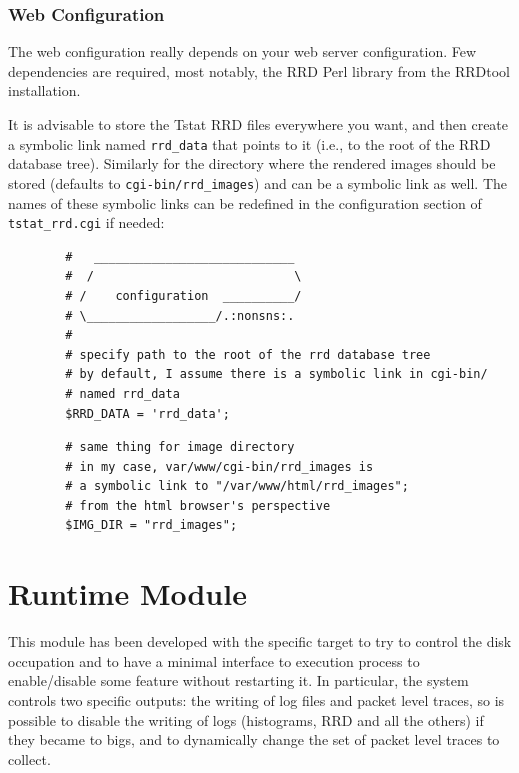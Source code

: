 \documentclass[11pt]{article}
\begin{document}
\subsubsection{Web Configuration\label{Web_Configuration}}


The web configuration really depends on your web server configuration. Few
dependencies are required, most notably, the RRD Perl library from the RRDtool
installation.



It is advisable to store the Tstat RRD files
everywhere you want, and then create a symbolic link 
named \texttt{rrd\_data} that points to it (i.e., to the root of 
the RRD database tree). Similarly for the directory
where the rendered images should be stored (defaults to \texttt{cgi-bin/rrd\_images})
and can be a symbolic link as well.
The names of these symbolic links can be redefined in the 
configuration section of \texttt{tstat\_rrd.cgi} if needed:

\begin{small}\begin{verbatim}
        #   ____________________________
        #  /                            \
        # /    configuration  __________/
        # \__________________/.:nonsns:.
        #
        # specify path to the root of the rrd database tree
        # by default, I assume there is a symbolic link in cgi-bin/
        # named rrd_data
        $RRD_DATA = 'rrd_data';
\end{verbatim}\end{small} \noindent
\begin{small}\begin{verbatim}
        # same thing for image directory
        # in my case, var/www/cgi-bin/rrd_images is
        # a symbolic link to "/var/www/html/rrd_images";
        # from the html browser's perspective
        $IMG_DIR = "rrd_images";
\end{verbatim}\end{small} \noindent
\section{Runtime Module\label{Runtime_Module}}


This module has been developed with the specific target to try to control the disk
occupation and to have a minimal interface
to execution process to enable/disable some feature without restarting it. 
In particular, the system controls two specific outputs: the writing of log files and packet level traces, so
is possible to disable the writing of logs (histograms, RRD and all the others) if they
became to bigs, and to dynamically change the set of packet level traces to collect.
\end{document}
